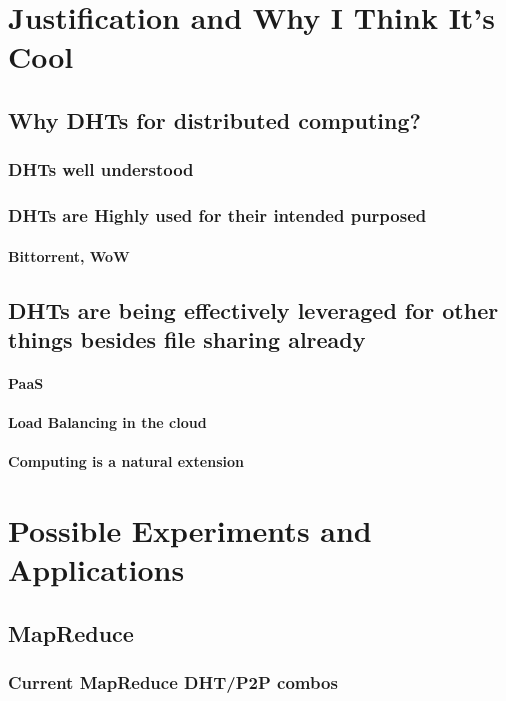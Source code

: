 \documentclass[10pt,letterpaper]{report}
\begin{document}
\chapter{Justification and Why I Think It's Cool}

\section{Why DHTs for distributed computing?}
\subsection{DHTs well understood}
\subsection{DHTs are Highly used for their intended purposed}
\subsubsection{Bittorrent, WoW}
\section{DHTs are being effectively leveraged for other things besides file sharing already}

\subsubsection{PaaS}
\subsubsection{Load Balancing in the cloud}
\subsubsection{Computing is a natural extension}

\chapter{Possible Experiments and Applications}


\section{MapReduce}
\subsection{Current MapReduce DHT/P2P combos}
\end{document}
